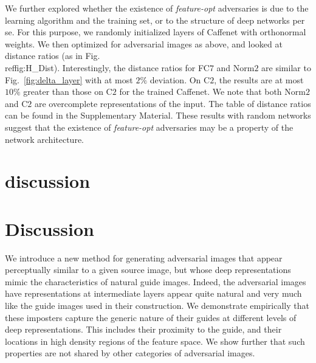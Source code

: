 \documentclass[10pt,twocolumn,letterpaper]{article}
\newcommand{\comment}[1]{}
\begin{document}
We further explored whether the existence of {\em feature-opt} adversaries 
is due to the learning algorithm and the training set, or to the structure 
of deep networks per se. For this purpose, we randomly initialized layers of 
Caffenet with orthonormal weights.  We then optimized for adversarial images 
as above, and looked at distance ratios (as in Fig.\\ref{fig:H_Dist}).  
Interestingly, the distance ratios for FC$7$ and Norm$2$ are similar to 
Fig.~\ref{fig:delta_layer} with at most $2\%$ deviation.  On C$2$, the results 
are at most $10\%$ greater than those on C$2$ for the trained Caffenet.  
We note that both Norm$2$ and C$2$ are overcomplete representations 
of the input. The table of distance ratios can be found in the 
Supplementary Material.
These results with random networks suggest that the existence of 
{\em feature-opt} adversaries may be a property of the network architecture.

\comment{This observation shows that the model itself is vulnerable to {\em 
feature-opt} adversaries, rather than just a specific trained network.}%
\section{discussion}
\section{Discussion}\vspace*{-0.1cm}

We introduce a new method for generating adversarial images that appear 
perceptually similar to a given source image, but whose deep representations 
mimic the characteristics of natural guide images. 
Indeed, the adversarial images have representations at intermediate 
layers appear quite natural and very much like the guide images used 
in their construction.
We demonstrate empirically that these imposters capture the generic 
nature of their guides at different levels of deep representations.  This 
includes their proximity to the guide, and their locations in high density 
regions of the feature space.
We show further that such properties are not shared by other
categories of adversarial images. 
\end{document}
